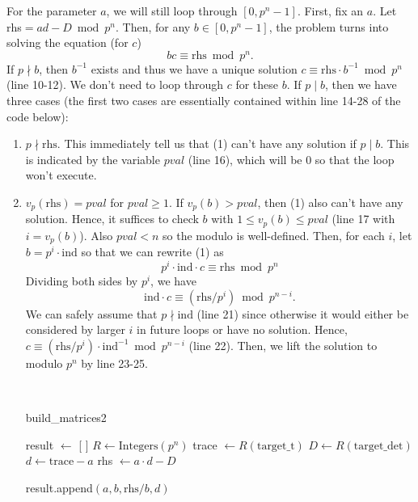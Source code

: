 \documentclass[letterpaper,12pt]{article}
\begin{document}
For the parameter $a$, we will still loop through $[0, p^n-1]$.
First, fix an $a$.
Let rhs$ = ad-D \bmod p^n$.
Then, for any $b \in [0, p^n-1]$,
the problem turns into solving the equation (for $c$)
\begin{equation}
bc \equiv \text{rhs} \bmod p^n .
\end{equation}
If $p \nmid b$, then $b^{-1}$ exists and thus 
we have a unique solution
$c \equiv \text{rhs} \cdot b^{-1} \bmod p^n$ (line 10-12).
We don't need to loop through $c$ for these $b$.
If $p \mid b$, then we have three cases 
(the first two cases are essentially contained within line 14-28 of the code below):
\begin{enumerate}
\item $p \nmid \text{rhs}$. This immediately tell us that (1) can't have any solution 
if $p \mid b$. This is indicated by the variable $pval$ (line 16), which will be 0
so that the loop won't execute.
\item $v_p(\text{rhs}) = pval$ for $pval \geq 1$.
If $v_p(b) > pval$, then (1) also can't have any solution.
Hence, it suffices to check $b$ with $1 \leq v_p(b) \leq pval$ (line 17 with $i = v_p(b)$).
Also $pval < n$ so the modulo is well-defined.
Then, for each $i$, let $b = p^i \cdot \text{ind}$ so that we can rewrite (1) as 
\[
p^i \cdot \text{ind} \cdot c \equiv \text{rhs} \bmod p^n
\]
Dividing both sides by $p^i$, we have
\[
\text{ind} \cdot c \equiv (\text{rhs} / p^i) \bmod p^{n-i}.
\]
We can safely assume that $p \nmid \text{ind}$ (line 21) since otherwise it would either be 
considered by larger $i$ in future loops or have no solution.
Hence, 
$c \equiv (\text{rhs} / p^i) \cdot \text{ind}^{-1} \bmod p^{n-i}$ (line 22).
Then, we lift the solution to modulo $p^n$ by line 23-25.

\

\begin{algorithm}
\caption{build\_matrices2}
\begin{algorithmic}[1]
    \State result $\gets$ [ ]
    \State $R \gets \text{Integers}(p^n)$
    \State trace $\gets R(\text{target\_t})$
    \State $D \gets R(\text{target\_det})$ \\
    
        \State $d \gets \text{trace} - a$
        \State rhs $\gets a \cdot d - D$
        
            \State result.append$(a, b, \text{rhs}/b, d)$
        \EndFor \\


\end{algorithmic}
\end{algorithm}
\end{enumerate}
\end{document}
